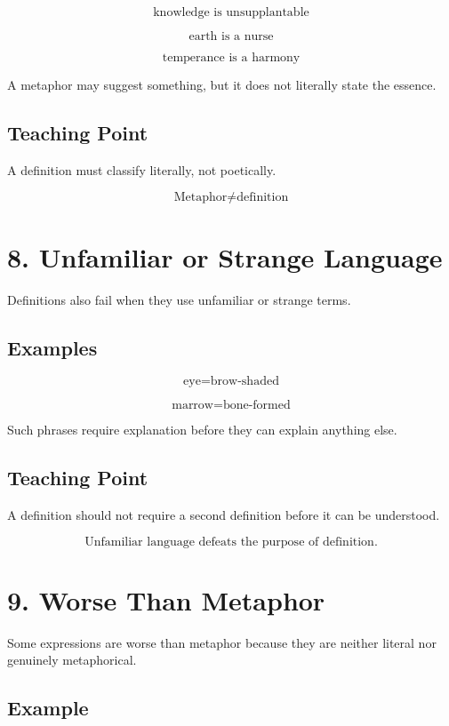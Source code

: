 \documentclass[12pt]{article}
\begin{document}
\[
\text{knowledge is unsupplantable}
\]

\[
\text{earth is a nurse}
\]

\[
\text{temperance is a harmony}
\]

A metaphor may suggest something, but it does not literally state the essence.

\subsection*{Teaching Point}

A definition must classify literally, not poetically.

\[
\boxed{
\text{Metaphor} \neq \text{definition}
}
\]

\section*{8. Unfamiliar or Strange Language}

Definitions also fail when they use unfamiliar or strange terms.

\subsection*{Examples}

\[
\text{eye} = \text{brow-shaded}
\]

\[
\text{marrow} = \text{bone-formed}
\]

Such phrases require explanation before they can explain anything else.

\subsection*{Teaching Point}

A definition should not require a second definition before it can be understood.

\[
\boxed{
\text{Unfamiliar language defeats the purpose of definition.}
}
\]

\section*{9. Worse Than Metaphor}

Some expressions are worse than metaphor because they are neither literal nor
genuinely metaphorical.

\subsection*{Example}
\end{document}
